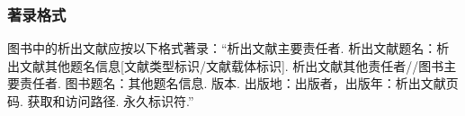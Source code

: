\documentclass[twoside]{article}%
\begin{document}



\subsubsection{著录格式}

图书中的析出文献应按以下格式著录：“析出文献主要责任者. 析出文献题名：析出文献其他题名信息[文献类型标识/文献载体标识]. 析出文献其他责任者//图书主要责任者. 图书题名：其他题名信息. 版本. 出版地：出版者，出版年：析出文献页码. 获取和访问路径. 永久标识符.”
\end{document}
